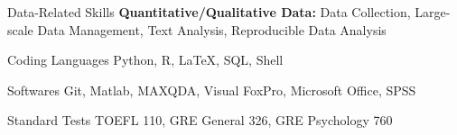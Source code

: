 
\begin{cvskills}
  \cvskill
    {Data-Related Skills} %
    {\textbf{Quantitative/Qualitative Data:} Data Collection, Large-scale Data Management, Text Analysis, Reproducible Data Analysis} %
    
  \cvskill
    {Coding Languages} %
    {Python, R, LaTeX, SQL, Shell} %
    
  \cvskill
    {Softwares} %
    {Git, Matlab, MAXQDA, Visual FoxPro, Microsoft Office, SPSS } %

  \cvskill
    {Standard Tests} %
    {TOEFL 110, GRE General 326, GRE Psychology 760} %

    



\end{cvskills}

